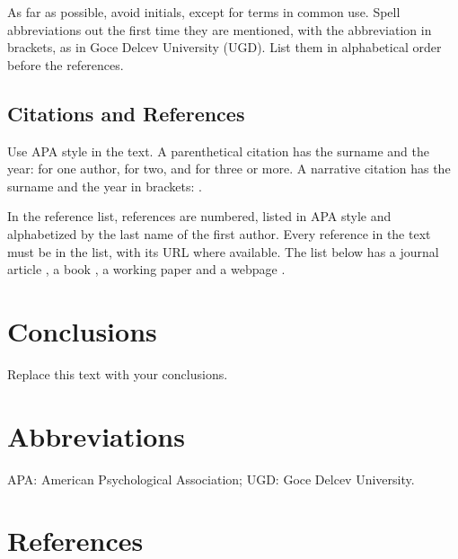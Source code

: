 \documentclass[11pt,a4paper]{article}
\begin{document}
As far as possible, avoid initials, except for terms in common use. Spell abbreviations out the first time they are mentioned, with the abbreviation in brackets, as in Goce Delcev University (UGD). List them in alphabetical order before the references.

\subsection{Citations and References}

Use APA style in the text. A parenthetical citation has the surname and the year: \parencite{taylor1993} for one author, \parencite{dieboldli2006} for two, and \parencite{clarida2000} for three or more. A narrative citation has the surname and the year in brackets: \textcite{taylor1993}.

In the reference list, references are numbered, listed in APA style and alphabetized by the last name of the first author. Every reference in the text must be in the list, with its URL where available. The list below has a journal article \parencite{veselinova2025}, a book \parencite{hamilton1994}, a working paper \parencite{svensson1994} and a webpage \parencite{jesubmissions}.

\section{Conclusions}
\label{sec:concl}

Replace this text with your conclusions.

\section*{Abbreviations}

APA: American Psychological Association; UGD: Goce Delcev University.

\section*{References}
\printbibliography[heading=none]
\end{document}
